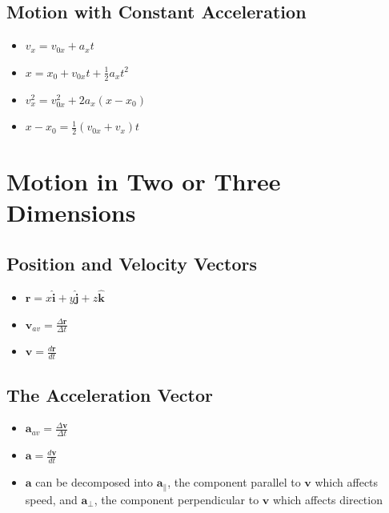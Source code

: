 \documentclass{article}
\begin{document}
\setcounter{subsection}{3}
\subsection{Motion with Constant Acceleration}

\begin{itemize}
  \item $v_x=v_{0x}+a_xt$

  \item $x=x_0+v_{0x}t+\frac{1}{2}a_xt^2$

  \item $v_x^2=v_{0x}^2+2a_x\left(x-x_0\right)$

  \item $x-x_0=\frac{1}{2}\left(v_{0x}+v_x\right)t$
\end{itemize}

\section{Motion in Two or Three Dimensions}

\subsection{Position and Velocity Vectors}

\begin{itemize}
  \item $\mathbf{r}=x\hat{\mathbf{i}}+y\hat{\mathbf{j}}+z\hat{\mathbf{k}}$

  \item $\mathbf{v}_{av}=\frac{\Delta\mathbf{r}}{\Delta t}$

  \item $\mathbf{v}=\frac{d\mathbf{r}}{dt}$
\end{itemize}

\subsection{The Acceleration Vector}

\begin{itemize}
  \item $\mathbf{a}_{av}=\frac{\Delta\mathbf{v}}{\Delta t}$

  \item $\mathbf{a}=\frac{d\mathbf{v}}{dt}$

  \item $\mathbf{a}$ can be decomposed into $\mathbf{a}_\parallel$, the component parallel to $\mathbf{v}$ which affects speed, and $\mathbf{a}_\perp$, the component perpendicular to $\mathbf{v}$ which affects direction
\end{itemize}
\end{document}
